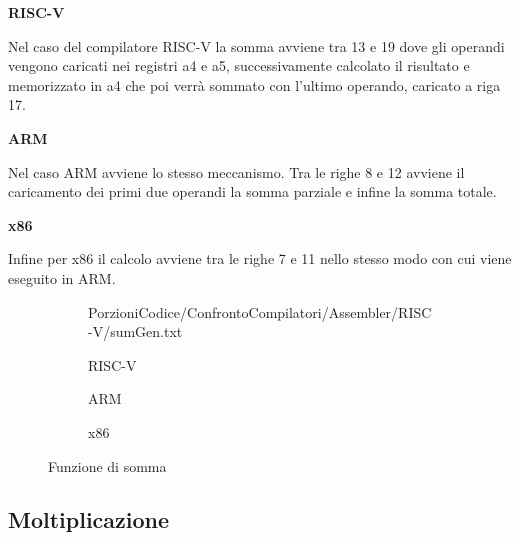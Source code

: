 \documentclass[12pt,a4paper]{report}
\begin{document}
\vspace{0.3 cm}
\textbf{RISC-V}

Nel caso del compilatore RISC-V la somma avviene tra 13 e 19 dove gli operandi vengono caricati nei registri a4 e a5,  successivamente calcolato il risultato e memorizzato in a4 che poi verrà sommato con l'ultimo operando, caricato a riga 17.

\vspace{0.3 cm}
\textbf{ARM}

Nel caso ARM avviene lo stesso meccanismo. Tra le righe 8 e 12 avviene il caricamento dei primi due operandi la somma parziale e infine la somma totale.

\vspace{0.3 cm}
\textbf{x86}

Infine per x86 il calcolo avviene tra le righe 7 e 11 nello stesso modo con cui viene eseguito in ARM.

\begin{figure}[h]
     
     \begin{subfigure}[b]{0.3\textwidth}
  
         {PorzioniCodice/ConfrontoCompilatori/Assembler/RISC-V/sumGen.txt}
	\label{Code:Add2RISC}
\caption{RISC-V}
     \end{subfigure}
     \hfill
     \begin{subfigure}[b]{0.3\textwidth}
         
          
          \label{Code:Add2ARM}
\caption{ARM}
     \end{subfigure}
     \hfill
     \begin{subfigure}[b]{0.3\textwidth}
         
          
	 \caption{x86}
	\label{Code:Add2X86}
     \end{subfigure}
    
        \caption{Funzione di somma}
        
\end{figure}



\subsection{Moltiplicazione}
\end{document}
